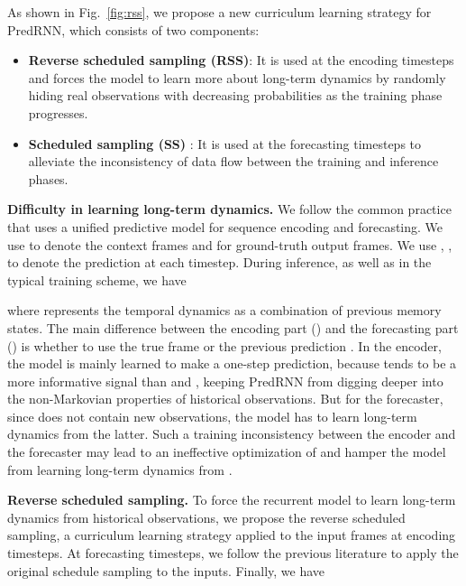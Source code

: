 \documentclass[10pt,journal,compsoc]{IEEEtran}
\newcommand{\fig}[1]{Fig.~\ref{#1}}
\newcommand{\myparagraph}[1]{\vspace{5pt} \noindent \textbf{#1.}}
\begin{document}
As shown in \fig{fig:rss}, we propose a new curriculum learning strategy for PredRNN, which consists of two components:
\begin{itemize}[leftmargin=*]
    \item \textbf{Reverse scheduled sampling (RSS)}: It is used at the encoding timesteps and forces the model to learn more about long-term dynamics by randomly hiding real observations with decreasing probabilities as the training phase progresses.
    \item \textbf{Scheduled sampling (SS)} \cite{bengio2015scheduled}: It is used at the forecasting timesteps to alleviate the inconsistency of data flow between the training and inference phases.
\end{itemize}




\myparagraph{Difficulty in learning long-term dynamics}
We follow the common practice \cite{Finn2016Unsupervised,denton2018stochastic} that uses a unified predictive model  for sequence encoding and forecasting.
We use  to denote the context frames and  for ground-truth output frames. We use , , to denote the prediction at each timestep. During inference, as well as in the typical training scheme, we have

where  represents the temporal dynamics as a combination of previous memory states. 
The main difference between the encoding part () and the forecasting part () is whether to use the true frame  or the previous prediction .
In the encoder, the model is mainly learned to make a one-step prediction, because  tends to be a more informative signal than   and , keeping PredRNN from digging deeper into the non-Markovian properties of historical observations. 
But for the forecaster, since  does not contain new observations, the model has to learn long-term dynamics from the latter. 
Such a training inconsistency between the encoder and the forecaster may lead to an ineffective optimization of  and hamper the model from learning long-term dynamics from .


\myparagraph{Reverse scheduled sampling}
To force the recurrent model to learn long-term dynamics from historical observations, we propose the reverse scheduled sampling, a curriculum learning strategy applied to the input frames at encoding timesteps. 
At forecasting timesteps, we follow the previous literature \cite{Finn2016Unsupervised,denton2018stochastic} to apply the original schedule sampling \cite{bengio2015scheduled} to the inputs.
Finally, we have
\end{document}
